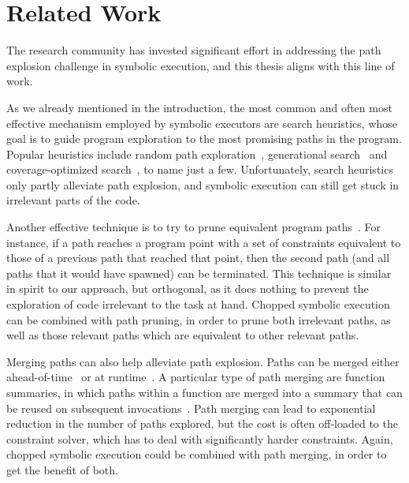 
\chapter{Related Work}\label{chapter:related}

The research community has invested significant effort in addressing
the path explosion challenge in symbolic execution, and this thesis
aligns with this line of work.

As we already mentioned in the introduction, the most common and often
most effective mechanism employed by symbolic executors are search
heuristics, whose goal is to guide program exploration to the most
promising paths in the program.  Popular heuristics include random
path exploration~\cite{klee}, generational search~\cite{sage} and
coverage-optimized search~\cite{exe,sen:concolicheuristics}, to name
just a few.  Unfortunately, search heuristics only partly alleviate
path explosion, and symbolic execution can still get stuck in
irrelevant parts of the code.

Another effective technique is to try to prune equivalent program
paths~\cite{exe:tacas,rwset2}.  For instance, if a path reaches a
program point with a set of constraints equivalent to those of a
previous path that reached that point, then the second path (and all
paths that it would have spawned) can be terminated.  This technique
is similar in spirit to our approach, but orthogonal, as it does
nothing to prevent the exploration of code irrelevant to the task at
hand.  Chopped symbolic execution can be combined with path pruning,
in order to prune both irrelevant paths, as well as those relevant
paths which are equivalent to other relevant paths.

Merging paths can also help alleviate path explosion.  Paths can be
merged either ahead-of-time~\cite{klee-fp,kleecl:tse} or at
runtime~\cite{merging:pldi12,multise:fse15}. A particular type of path
merging are function summaries, in which paths within a function are
merged into a summary that can be reused on subsequent
invocations~\cite{godefroid:popl,godefroid:tacas}. Path merging can
lead to exponential reduction in the number of paths explored, but the
cost is often off-loaded to the constraint solver, which has to deal
with significantly harder constraints.  Again, chopped symbolic
execution could be combined with path merging, in order to get the
benefit of both.

